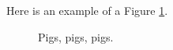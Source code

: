
Here is an example of a Figure \ref{fig:fig}.

\begin{figure}[!h]
  \centering
  \caption[This is a special label, used only in the List of Figures]
          {Pigs, pigs, pigs.}
  \label{fig:fig}
\end{figure}
